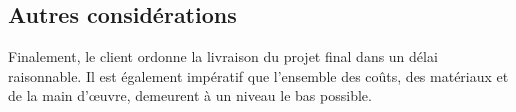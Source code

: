 

\subsection{Autres considérations}
\label{s:beo_bes_autres}

Finalement, le client ordonne la livraison du projet final dans un délai raisonnable.
Il est également impératif que l’ensemble des coûts, des matériaux et de la main d’œuvre, demeurent à un niveau le bas possible.